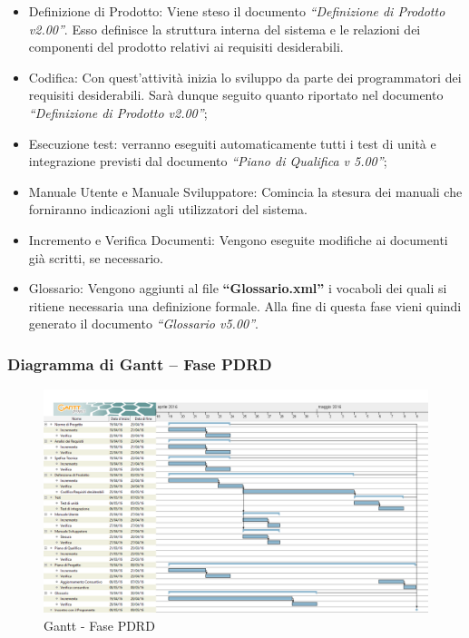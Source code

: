 \documentclass[../PianoProgetto.tex]{subfiles}
\begin{document}
		\begin{itemize}
			\item Definizione di Prodotto: Viene steso il documento \textit{“Definizione di Prodotto v2.00”}. Esso definisce la struttura interna del sistema e le relazioni dei componenti del prodotto relativi ai requisiti desiderabili.

			\item Codifica: Con quest’attività inizia lo sviluppo da parte dei programmatori dei requisiti desiderabili. Sarà dunque seguito quanto riportato nel documento \textit{“Definizione di Prodotto v2.00”};

	 		\item Esecuzione test: verranno eseguiti automaticamente tutti i test di unità e integrazione previsti dal documento \textit{“Piano di Qualifica v 5.00”};

			\item Manuale Utente e Manuale Sviluppatore: Comincia la stesura dei manuali che forniranno indicazioni agli utilizzatori del sistema.

			\item Incremento e Verifica Documenti: Vengono eseguite modifiche ai documenti già scritti, se necessario.

			\item Glossario: Vengono aggiunti al file \textbf{“Glossario.xml”} i vocaboli dei quali si ritiene necessaria una definizione formale. Alla fine di questa fase vieni quindi generato il documento \textit{“Glossario v5.00”}.
		\end{itemize}
		\newpage
		\subsubsection{Diagramma di Gantt – Fase PDRD}
			\begin{figure}[!h]
				\centering
				\includegraphics[width=\textwidth]{gantt_png/5-requisiti_desiderabili}
				\caption{Gantt - Fase PDRD}
				\label{fig:Gantt - Fase PDRD}
			\end{figure}
			
\end{document}
